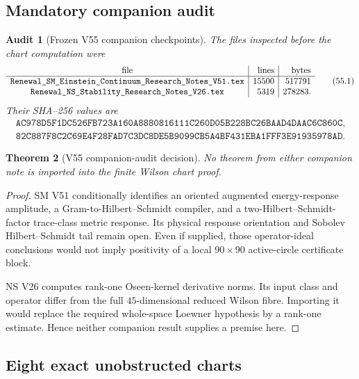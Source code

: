 \documentclass[11pt,oneside]{article}
\newtheorem{theorem}{Theorem}[section]
\newtheorem{audit}[theorem]{Audit}
\theoremstyle{definition}
\theoremstyle{remark}
\begin{document}
\subsection{Mandatory companion audit}

\begin{audit}[Frozen V55 companion checkpoints]
\label{aud:newv55-companions}
The files inspected before the chart computation were
\[
\begin{array}{c|r|r}
\hbox{file}&\hbox{lines}&\hbox{bytes}\\ \hline
\texttt{Renewal\_SM\_Einstein\_Continuum\_Research\_Notes\_V51.tex}
 &15500&517791\\
\texttt{Renewal\_NS\_Stability\_Research\_Notes\_V26.tex}
 &5319&278283.
\end{array}                                             \tag{55.1}
\]
Their SHA--256 values are
\[
\begin{gathered}
\texttt{AC978D5F1DC526FB723A160A8880816111C260D05B228BC26BAAD4DAAC6C860C},\\
\texttt{82C887F8C2C69E4F28FAD7C3DC8DE5B9099CB5A4BF431EBA1FFF3E91935978AD}.
\end{gathered}                                         \tag{55.2}
\]
\end{audit}

\begin{theorem}[V55 companion-audit decision]
\label{thm:newv55-audit}
No theorem from either companion note is imported into the finite
Wilson chart proof.
\end{theorem}

\begin{proof}
SM V51 conditionally identifies an oriented augmented
energy-response amplitude, a Gram-to-Hilbert--Schmidt compiler, and
a two-Hilbert--Schmidt-factor trace-class metric response.  Its
physical response orientation and Sobolev Hilbert--Schmidt tail
remain open.  Even if supplied, those operator-ideal conclusions
would not imply positivity of a local \(90\times90\) active-circle
certificate block.

NS V26 computes rank-one Oseen-kernel derivative norms.  Its input
class and operator differ from the full \(45\)-dimensional reduced
Wilson fibre.  Importing it would replace the required whole-space
Loewner hypothesis by a rank-one estimate.  Hence neither
companion result supplies a premise here.
\end{proof}

\subsection{Eight exact unobstructed charts}
\end{document}

